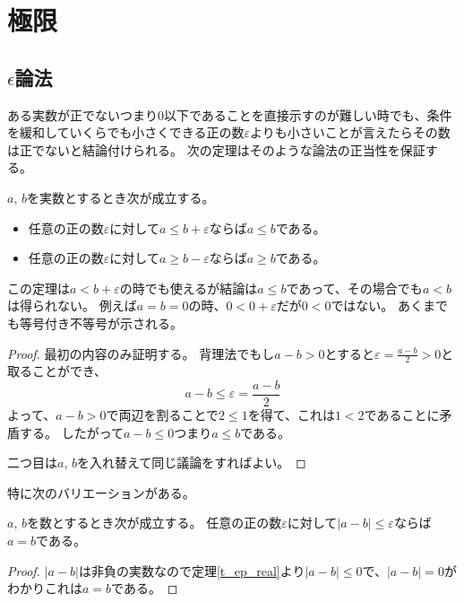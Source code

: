 
\chapter{極限}

\section{$\epsilon$論法}

ある実数が正でないつまり$0$以下であることを直接示すのが難しい時でも、条件を緩和していくらでも小さくできる正の数$\varepsilon$よりも小さいことが言えたらその数は正でないと結論付けられる。
次の定理はそのような論法の正当性を保証する。

\begin{theorem}
\label{t_ep_real}
$a$, $b$を実数とするとき次が成立する。
\begin{itemize}
\item
任意の正の数$\varepsilon$に対して$a \le b+\varepsilon$ならば$a \le b$である。
\item
任意の正の数$\varepsilon$に対して$a \ge b-\varepsilon$ならば$a \ge b$である。
\end{itemize}
\end{theorem}

\begin{remark}
この定理は$a < b+\varepsilon$の時でも使えるが結論は$a \le b$であって、その場合でも$a < b$は得られない。
例えば$a = b = 0$の時、$0 < 0+\varepsilon$だが$0 < 0$ではない。
あくまでも等号付き不等号が示される。
\end{remark}

\begin{proof}
最初の内容のみ証明する。
背理法でもし$a-b > 0$とすると$\varepsilon = \frac{a-b}{2} > 0$と取ることができ、
$$
a-b \le \varepsilon = \frac{a-b}{2}
$$
よって、$a-b > 0$で両辺を割ることで$2 \le 1$を得て、これは$1 < 2$であることに矛盾する。
したがって$a-b \le 0$つまり$a \le b$である。

二つ目は$a$, $b$を入れ替えて同じ議論をすればよい。
\end{proof}

特に次のバリエーションがある。

\begin{theorem}
\label{t_ep_number}
$a$, $b$を数とするとき次が成立する。
任意の正の数$\varepsilon$に対して$|a-b| \le \varepsilon$ならば$a = b$である。
\end{theorem}

\begin{proof}
$|a-b|$は非負の実数なので定理\ref{t_ep_real}より$|a-b| \le 0$で、$|a-b| = 0$がわかりこれは$a = b$である。
\end{proof}

